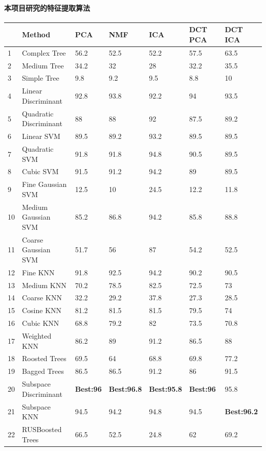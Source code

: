 \paragraph{本项目研究的特征提取算法}
\begin{center}
\begin{tabular}{|l|l|l|l|l|l|l|}
\hline
&Method&PCA&NMF&ICA& DCT PCA & DCT ICA\\\hline
1&Complex Tree &56.2&52.5&52.2&57.5&63.5\\\hline
2&Medium Tree & 34.2&32&28&32.2&35.5\\\hline
3&Simple Tree & 9.8&9.2&9.5&8.8&10\\\hline
4&Linear Discriminant & 92.8&93.8&92.2&94&93.5\\\hline
5&Quadratic Discriminant & 88&88&92&87.5&89.2\\\hline
6&Linear SVM& 89.5&89.2&93.2&89.5&89.5\\\hline
7&Quadratic SVM&91.8&91.8&94.8&90.5&89.5\\\hline
8&Cubic SVM& 91.5&91.2&94.2&89&89.5\\\hline
9&Fine Gaussian SVM&12.5&10&24.5&12.2&11.8\\\hline
10&Medium Gaussian SVM&85.2&86.8&94.2&85.8&88.8\\\hline
11&Coarse Gaussian SVM&51.7&56&87&54.2&52.5\\\hline
12&Fine KNN&91.8&92.5&94.2&90.2&90.5\\\hline
13&Medium KNN&70.2&78.5&82.5&72.5&73\\\hline
14&Coarse KNN&32.2&29.2&37.8&27.3&28.5\\\hline
15&Cosine KNN&81.2&81.5&81.5&79.5&74\\\hline
16&Cubic KNN&68.8&79.2&82&73.5&70.8\\\hline
17&Weighted KNN&86.2&89&91.2&86.5&88\\\hline
18&Roosted Trees&69.5&64&68.8&69.8&77.2\\\hline
19&Bagged Trees&86.5&86.5&91.2&86&91.5\\\hline
20&Subspace Discriminant&\textbf{Best:96}&\textbf{Best:96.8}&\textbf{Best:95.8}&\textbf{Best:96}&95.8\\\hline
21&Subspace KNN&94.5&94.2&94.8&94.5&\textbf{Best:96.2}\\\hline
22&RUSBoosted Trees&66.5&52.5&24.8&62&69.2\\\hline
\end{tabular}
\end{center}

